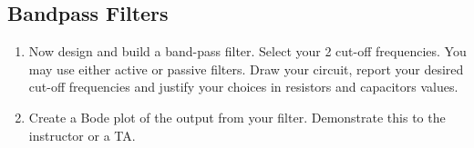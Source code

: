 \documentclass{article}
\begin{document}
\subsection*{Bandpass Filters}
\begin{enumerate}
	\item Now design and build a band-pass filter. Select your 2 cut-off frequencies. You may use either active or passive filters. Draw your circuit, report your desired cut-off frequencies and justify your choices in resistors and capacitors values.
	\item Create a Bode plot of the output from your filter. Demonstrate this to the instructor or a TA.
\end{enumerate}
\end{document}

